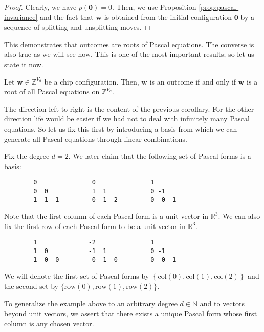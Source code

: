\begin{proof}
    Clearly, we have \( p(\mathbf 0) = 0 \). Then, we use Proposition \ref{prop:pascal-invariance} and the fact that \( \mathbf{w} \) is obtained from the initial configuration \( \mathbf{0} \) by a sequence of splitting and unsplitting moves.
\end{proof}

This demonstrates that outcomes are roots of Pascal equations. The converse is also true as we will see now. This is one of the most important results; so let us state it now.

\begin{theorem}\label{thm:pascal-outcome}
    Let \( \mathbf{w}\in \mathbb{Z}^{V_d} \) be a chip configuration. Then, \( \mathbf{w} \) is an outcome if and only if \( \mathbf{w} \) is a root of all Pascal equations on \( \mathbb{Z}^{V_d} \).
\end{theorem}

The direction left to right is the content of the previous corollary. For the other direction life would be easier if we had not to deal with infinitely many Pascal equations. So let us fix this first by introducing a basis from which we can generate all Pascal equations through linear combinations.

\begin{example}\label{ex:pascal-basis}
    Fix the degree \( d = 2 \). We later claim that the following set of Pascal forms is a basis:
    \begin{verbatim}
        0               0               1               
        0  0            1  1            0 -1           
        1  1  1         0 -1 -2         0  0  1        
    \end{verbatim}
    Note that the first column of each Pascal form is a unit vector in \( \mathbb{R}^3 \). We can also fix the first row of each Pascal form to be a unit vector in \( \mathbb{R}^3 \).
    \begin{verbatim}
        1              -2               1               
        1  0           -1  1            0 -1           
        1  0  0         0  1  0         0  0  1
    \end{verbatim} 
    We will denote the first set of Pascal forms by \( \left\{ \mathrm{col}(0), \mathrm{col}(1), \mathrm{col}(2) \right\} \) and the second set by \( \{ \mathrm{row}(0), \mathrm{row}(1), \mathrm{row}(2) \} \).
\end{example}

To generalize the example above to an arbitrary degree \( d \in \mathbb{N} \) and to vectors beyond unit vectors, we assert that there exists a unique Pascal form whose first column is any chosen vector.

